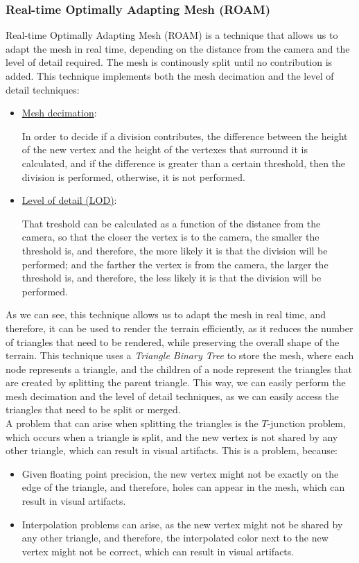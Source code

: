 \subsubsection{Real-time Optimally Adapting Mesh (ROAM)}
Real-time Optimally Adapting Mesh (ROAM) is a technique that allows us to adapt the mesh in real time, depending on the distance from the camera and the level of detail required. The mesh is continously split until no contribution is added. This technique implements both the mesh decimation and the level of detail techniques:
\begin{itemize}
    \item \ul{Mesh decimation}:

    In order to decide if a division contributes, the difference between the height of the new vertex and the height of the vertexes that surround it is calculated, and if the difference is greater than a certain threshold, then the division is performed, otherwise, it is not performed.
    \item \ul{Level of detail (LOD)}:

    That treshold can be calculated as a function of the distance from the camera, so that the closer the vertex is to the camera, the smaller the threshold is, and therefore, the more likely it is that the division will be performed; and the farther the vertex is from the camera, the larger the threshold is, and therefore, the less likely it is that the division will be performed.
\end{itemize}

As we can see, this technique allows us to adapt the mesh in real time, and therefore, it can be used to render the terrain efficiently, as it reduces the number of triangles that need to be rendered, while preserving the overall shape of the terrain. This technique uses a \emph{Triangle Binary Tree} to store the mesh, where each node represents a triangle, and the children of a node represent the triangles that are created by splitting the parent triangle. This way, we can easily perform the mesh decimation and the level of detail techniques, as we can easily access the triangles that need to be split or merged.\\

A problem that can arise when splitting the triangles is the $T$-junction problem, which occurs when a triangle is split, and the new vertex is not shared by any other triangle, which can result in visual artifacts. This is a problem, because:
\begin{itemize}
    \item Given floating point precision, the new vertex might not be exactly on the edge of the triangle, and therefore, holes can appear in the mesh, which can result in visual artifacts.
    \item Interpolation problems can arise, as the new vertex might not be shared by any other triangle, and therefore, the interpolated color next to the new vertex might not be correct, which can result in visual artifacts.
\end{itemize}

